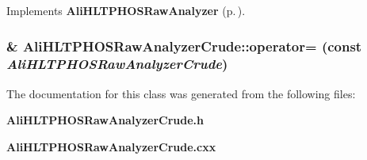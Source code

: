 Implements {\bf Ali\-HLTPHOSRaw\-Analyzer} {\rm (p.\,\pageref{classAliHLTPHOSRawAnalyzer_a14})}.
\subsubsection{\& Ali\-HLTPHOSRaw\-Analyzer\-Crude::operator= (const  {\em Ali\-HLTPHOSRaw\-Analyzer\-Crude})\hspace{0.3cm}{\tt  [inline]}}\label{classAliHLTPHOSRawAnalyzerCrude_a2}




The documentation for this class was generated from the following files:\begin{CompactItemize}
\item 
{\bf Ali\-HLTPHOSRaw\-Analyzer\-Crude.h}\item 
{\bf Ali\-HLTPHOSRaw\-Analyzer\-Crude.cxx}\end{CompactItemize}
